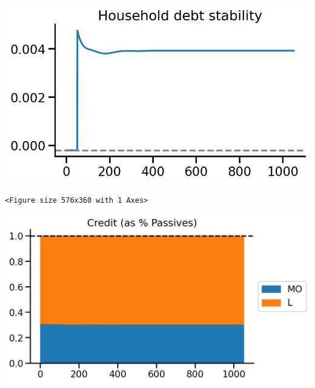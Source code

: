 \documentclass[11pt]{article}
\begin{document}
\begin{center}
\includegraphics[width=.9\linewidth]{obipy-resources/833ba20b4aec1c9746a2e4fcac62a826eabb201d/4a96f305d4603d65d8d3f9a9fb2e181ac11cd89d.png}
\end{center}

\begin{verbatim}
<Figure size 576x360 with 1 Axes>
\end{verbatim}


\begin{center}
\includegraphics[width=.9\linewidth]{obipy-resources/833ba20b4aec1c9746a2e4fcac62a826eabb201d/eda91cc269f793debd12422a7d4cb65ca7f9aad0.png}
\end{center}
\end{document}
